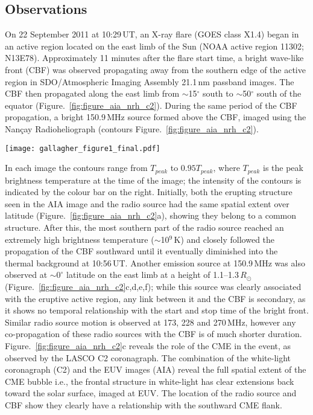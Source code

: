 \subsection{Observations}
On 22 September 2011 at 10:29\,UT, an X-ray flare (GOES class X1.4) began in an active region located on the east limb of the Sun (NOAA active region 11302; N13E78). Approximately 11 minutes after the flare start time, a bright wave-like front (CBF) was observed propagating away from the southern edge of the active region in SDO/Atmospheric Imaging Assembly \citep[AIA;][]{lemen2012} 21.1\,nm passband images. The CBF then propagated along the east limb from $\sim$15$^{\circ}\,$\,south to $\sim$50$^{\circ}\,$\,south of the equator (Figure.~\ref{fig:figure_aia_nrh_c2}). During the same period of the CBF propagation, a bright 150.9\,MHz source formed above the CBF, imaged using the Nan\c{c}ay Radioheliograph \citep[NRH;][]{kerdraon1997} (contours Figure.~\ref{fig:figure_aia_nrh_c2}). 
%
%
\begin{sidewaysfigure}
    \centering
	\texttt{[image: gallagher\_figure1\_final.pdf]}
	\caption{Caption}
	\label{fig:figure_aia_nrh_c2}
\end{sidewaysfigure}
%
%
In each image the contours range from $T_{peak}$ to $0.95T_{peak}$, where $T_{peak}$ is the peak brightness temperature at the time of the image; the intensity of the contours is indicated by the colour bar on the right. Initially, both the erupting structure seen in the AIA image and the radio source had the same spatial extent over latitude (Figure.~\ref{fig:figure_aia_nrh_c2}a), showing they belong to a common structure. After this, the most southern part of the radio source reached an extremely high brightness temperature ($\sim$10$^9$\,K) and closely followed the propagation of the CBF southward until it eventually diminished into the thermal background at 10:56\,UT. Another emission source at 150.9\,MHz was also observed at $\sim$$0^{\circ}$ latitude on the east limb at a height of 1.1--1.3$\,R_{\odot}$ (Figure.~\ref{fig:figure_aia_nrh_c2}c,d,e,f); while this source was clearly associated with the eruptive active region, any link between it and the CBF is secondary, as it shows no temporal relationship with the start and stop time of the bright front. Similar radio source motion is observed at 173, 228 and 270\,MHz, however any co-propagation of these radio sources with the CBF is of much shorter duration. Figure.~\ref{fig:figure_aia_nrh_c2}c 
reveals the role of the CME in the event, as observed by the LASCO C2 coronagraph. The combination of the white-light coronagraph (C2) and the EUV images (AIA) reveal the full spatial extent of the CME bubble i.e., the frontal structure in white-light has clear extensions back toward the solar surface, imaged at EUV. The location of the radio source and CBF show they clearly have a relationship with the southward CME flank.

